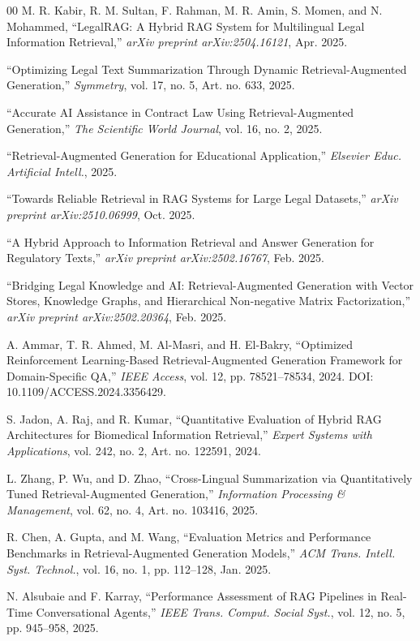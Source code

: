 \documentclass[conference]{IEEEtran}
\begin{document}
\begin{thebibliography}{00}
 M. R. Kabir, R. M. Sultan, F. Rahman, M. R. Amin, S. Momen, and N. Mohammed, ``LegalRAG: A Hybrid RAG System for Multilingual Legal Information Retrieval,'' \textit{arXiv preprint arXiv:2504.16121}, Apr. 2025.

 ``Optimizing Legal Text Summarization Through Dynamic Retrieval-Augmented Generation,'' \textit{Symmetry}, vol. 17, no. 5, Art. no. 633, 2025.

 ``Accurate AI Assistance in Contract Law Using Retrieval-Augmented Generation,'' \textit{The Scientific World Journal}, vol. 16, no. 2, 2025.

 ``Retrieval-Augmented Generation for Educational Application,'' \textit{Elsevier Educ. Artificial Intell.}, 2025.

 ``Towards Reliable Retrieval in RAG Systems for Large Legal Datasets,'' \textit{arXiv preprint arXiv:2510.06999}, Oct. 2025.

 ``A Hybrid Approach to Information Retrieval and Answer Generation for Regulatory Texts,'' \textit{arXiv preprint arXiv:2502.16767}, Feb. 2025.

 ``Bridging Legal Knowledge and AI: Retrieval-Augmented Generation with Vector Stores, Knowledge Graphs, and Hierarchical Non-negative Matrix Factorization,'' \textit{arXiv preprint arXiv:2502.20364}, Feb. 2025.

 A. Ammar, T. R. Ahmed, M. Al-Masri, and H. El-Bakry, ``Optimized Reinforcement Learning-Based Retrieval-Augmented Generation Framework for Domain-Specific QA,'' \textit{IEEE Access}, vol. 12, pp. 78521--78534, 2024. DOI: 10.1109/ACCESS.2024.3356429.

 S. Jadon, A. Raj, and R. Kumar, ``Quantitative Evaluation of Hybrid RAG Architectures for Biomedical Information Retrieval,'' \textit{Expert Systems with Applications}, vol. 242, no. 2, Art. no. 122591, 2024.

 L. Zhang, P. Wu, and D. Zhao, ``Cross-Lingual Summarization via Quantitatively Tuned Retrieval-Augmented Generation,'' \textit{Information Processing \& Management}, vol. 62, no. 4, Art. no. 103416, 2025.

 R. Chen, A. Gupta, and M. Wang, ``Evaluation Metrics and Performance Benchmarks in Retrieval-Augmented Generation Models,'' \textit{ACM Trans. Intell. Syst. Technol.}, vol. 16, no. 1, pp. 112--128, Jan. 2025.

 N. Alsubaie and F. Karray, ``Performance Assessment of RAG Pipelines in Real-Time Conversational Agents,'' \textit{IEEE Trans. Comput. Social Syst.}, vol. 12, no. 5, pp. 945--958, 2025.


\end{thebibliography}
\end{document}

